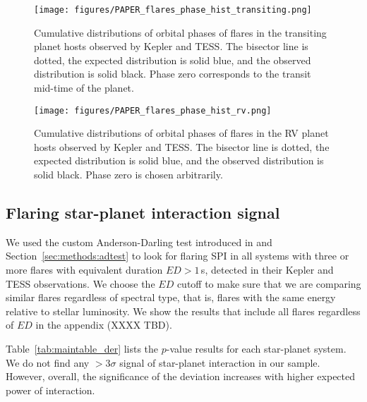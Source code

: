 \documentclass[twocolumn]{aastex631}
\begin{document}
\begin{figure*}[ht!]
    \begin{centering}
        \texttt{[image: figures/PAPER\_flares\_phase\_hist\_transiting.png]}
        \caption{
            Cumulative distributions of orbital phases of flares in the transiting planet hosts observed by Kepler and TESS. The bisector line is dotted, the expected distribution is solid blue, and the observed distribution is solid black. Phase zero corresponds to the transit mid-time of the planet. 
        }
        \label{fig:cumdist_transiting}
    \end{centering}
\end{figure*}

\begin{figure*}[ht!]
    \begin{centering}
        \texttt{[image: figures/PAPER\_flares\_phase\_hist\_rv.png]}
        \caption{
            Cumulative distributions of orbital phases of flares in the RV planet hosts observed by Kepler and TESS. The bisector line is dotted, the expected distribution is solid blue, and the observed distribution is solid black. Phase zero is chosen arbitrarily. 
        }
        \label{fig:cumdist_rv}
    \end{centering}
\end{figure*}

\subsection{Flaring star-planet interaction signal}
\label{sec:results:spi}
We used the custom Anderson-Darling test introduced in  \citet{ilin2022searching} and Section~\ref{sec:methods:adtest} to look for flaring SPI in all systems with three or more flares with equivalent duration $ED>1\,$s, detected in their Kepler and TESS observations. We choose the $ED$ cutoff to make sure that we are comparing similar flares regardless of spectral type, that is, flares with the same energy relative to stellar luminosity. We show the results that include all flares regardless of $ED$ in the appendix (XXXX TBD).

Table~\ref{tab:maintable_der} lists the $p$-value results for each star-planet system. We do not find any $>3\sigma$ signal of star-planet interaction in our sample. However, overall, the significance of the deviation increases with higher expected power of interaction. 
\end{document}
